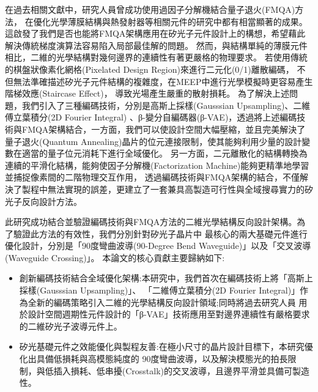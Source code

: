 在過去相關文獻中，研究人員曾成功使用過因子分解機結合量子退火(FMQA)方法，
在優化光學薄膜結構與熱發射器等相關元件的研究中都有相當顯著的成果。
這啟發了我們是否也能將FMQA架構應用在矽光子元件設計上的構想，希望藉此解決傳統梯度演算法容易陷入局部最佳解的問題。
然而，與結構單純的薄膜元件相比，二維的光學結構對幾何邊界的連續性有著更嚴格的物理要求。
若使用傳統的棋盤狀像素化網格(Pixelated Design Region)來進行二元化(0/1)離散編碼，
不但無法準確描述矽光子元件結構的複雜度，在MEEP中進行光學模擬時更容易產生階梯效應(Staircase Effect)，
導致光場產生嚴重的散射損耗。
為了解決上述問題，我們引入了三種編碼技術，分別是高斯上採樣(Gausssian Upsampling)、二維傅立葉積分(2D Fourier Integral)
、β-變分自編碼器(β-VAE)，透過將上述編碼技術與FMQA架構結合，一方面，我們可以使設計空間大幅壓縮，並且完美解決了
量子退火(Quantum Annealing)晶片的位元連接限制，使其能夠利用少量的設計變數在適當的量子位元消耗下進行全域優化。
另一方面，二元離散化的結構轉換為連續的平滑化結構，能夠使因子分解機(Factorization Machine)能夠更精準地學習並捕捉像素間的二階物理交互作用，
透過編碼技術與FMQA架構的結合，不僅解決了製程中無法實現的誤差，更建立了一套兼具高製造可行性與全域搜尋實力的矽光子反向設計方法。

此研究成功結合並驗證編碼技術與FMQA方法的二維光學結構反向設計架構。為了驗證此方法的有效性，我們分別針對矽光子晶片中
最核心的兩大基礎元件進行優化設計，分別是「90度彎曲波導(90-Degree Bend Waveguide)」以及「交叉波導(Waveguide Crossing)」。
本論文的核心貢獻主要歸納如下:
\begin{itemize}
    \item 創新編碼技術結合全域優化架構:本研究中，我們首次在編碼技術上將「高斯上採樣(Gausssian Upsampling)」、
    「二維傅立葉積分(2D Fourier Integral)」作為全新的編碼策略引入二維的光學結構反向設計領域;同時將過去研究人員
    用於設計空間週期性元件設計的「β-VAE」技術應用至對邊界連續性有嚴格要求的二維矽光子波導元件上。
    \item 矽光基礎元件之效能優化與製程友善:在極小尺寸的晶片設計目標下，本研究優化出具備低損耗與高模態純度的
    90度彎曲波導，以及解決模態光的拍長限制，與低插入損耗、低串擾(Crosstalk)的交叉波導，且邊界平滑並具備可製造性。
\end{itemize}